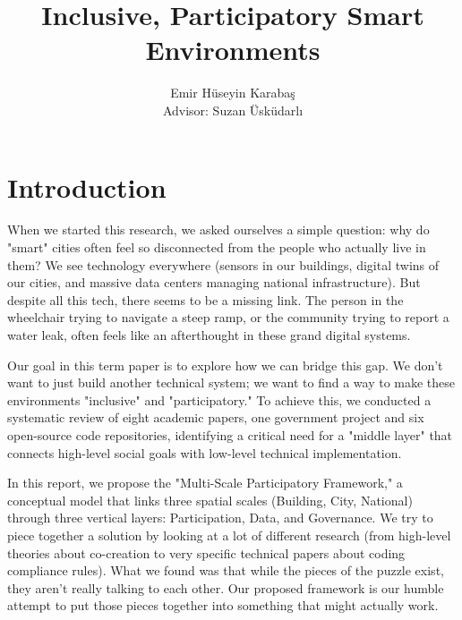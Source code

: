 \documentclass[a4paper,oneside,12pt]{report}
\title{Inclusive, Participatory Smart Environments}
\author{Emir Hüseyin Karabaş \\ Advisor: Suzan Üsküdarlı}
\begin{document}
\maketitle{}

\tableofcontents
\newpage


\chapter{Introduction}

When we started this research, we asked ourselves a simple question: why do "smart" cities often feel so disconnected from the people who actually live in them? We see technology everywhere (sensors in our buildings, digital twins of our cities, and massive data centers managing national infrastructure). But despite all this tech, there seems to be a missing link. The person in the wheelchair trying to navigate a steep ramp, or the community trying to report a water leak, often feels like an afterthought in these grand digital systems.

Our goal in this term paper is to explore how we can bridge this gap. We don't want to just build another technical system; we want to find a way to make these environments "inclusive" and "participatory." To achieve this, we conducted a systematic review of eight academic papers, one government project and six open-source code repositories, identifying a critical need for a "middle layer" that connects high-level social goals with low-level technical implementation.

In this report, we propose the "Multi-Scale Participatory Framework," a conceptual model that links three spatial scales (Building, City, National) through three vertical layers: Participation, Data, and Governance. We try to piece together a solution by looking at a lot of different research (from high-level theories about co-creation to very specific technical papers about coding compliance rules). What we found was that while the pieces of the puzzle exist, they aren't really talking to each other. Our proposed framework is our humble attempt to put those pieces together into something that might actually work.

\end{document}
